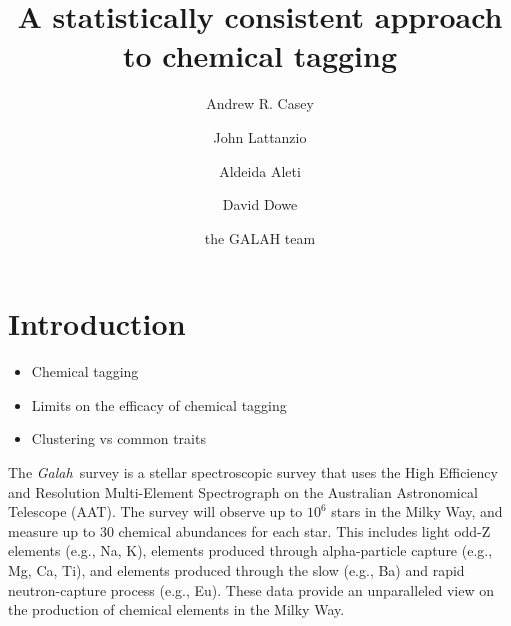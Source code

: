 \documentclass[twocolumn]{aastex61}
\newcommand{\project}[1]{\textsl{#1}}
\newcommand{\Galah}{\project{Galah}}
\begin{document}
\title{A statistically consistent approach to chemical tagging}


\author[0000-0003-0174-0564]{Andrew R. Casey}
			 
\author{John Lattanzio}

\author{Aldeida Aleti}

\author{David Dowe}

\author{the GALAH team}


\begin{abstract}
\end{abstract}



\section{Introduction} \label{sec:intro}

\begin{itemize}
	\item Chemical tagging
	\item Limits on the efficacy of chemical tagging
	\item Clustering vs common traits
\end{itemize}


The \Galah\ survey \citep{DaSilva:2015} is a stellar spectroscopic survey 
that uses the High Efficiency and Resolution Multi-Element 
Spectrograph \citep[HERMES][]{Sheinis:2016} on the Australian Astronomical Telescope (AAT).
The survey will observe up to $10^6$ stars in the Milky Way, and
measure up to 30 chemical abundances for each star. This includes
light odd-Z elements (e.g., Na, K), elements produced through
alpha-particle capture (e.g., Mg, Ca, Ti), and elements produced
through the slow (e.g., Ba) and rapid neutron-capture process
(e.g., Eu). These data provide an unparalleled view on the production
of chemical elements in the Milky Way.
\end{document}
